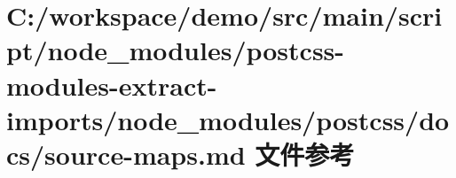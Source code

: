 \hypertarget{postcss-modules-extract-imports_2node__modules_2postcss_2docs_2source-maps_8md}{}\section{C\+:/workspace/demo/src/main/script/node\+\_\+modules/postcss-\/modules-\/extract-\/imports/node\+\_\+modules/postcss/docs/source-\/maps.md 文件参考}
\label{postcss-modules-extract-imports_2node__modules_2postcss_2docs_2source-maps_8md}
